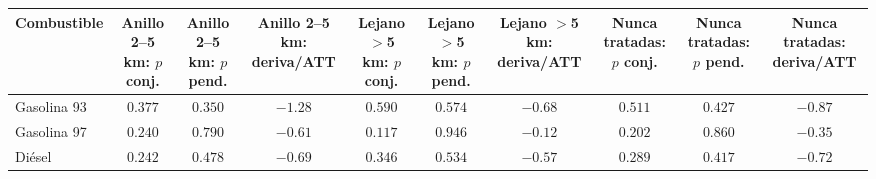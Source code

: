 \begin{tabular}{lccccccccc}
\toprule
Combustible & Anillo 2--5 km: $p$ conj. & Anillo 2--5 km: $p$ pend. & Anillo 2--5 km: deriva/ATT & Lejano $>$5 km: $p$ conj. & Lejano $>$5 km: $p$ pend. & Lejano $>$5 km: deriva/ATT & Nunca tratadas: $p$ conj. & Nunca tratadas: $p$ pend. & Nunca tratadas: deriva/ATT \\
\midrule
Gasolina 93 & $0.377$ & $0.350$ & $-1.28$ & $0.590$ & $0.574$ & $-0.68$ & $0.511$ & $0.427$ & $-0.87$ \\
Gasolina 97 & $0.240$ & $0.790$ & $-0.61$ & $0.117$ & $0.946$ & $-0.12$ & $0.202$ & $0.860$ & $-0.35$ \\
Diésel & $0.242$ & $0.478$ & $-0.69$ & $0.346$ & $0.534$ & $-0.57$ & $0.289$ & $0.417$ & $-0.72$ \\
\bottomrule
\end{tabular}
